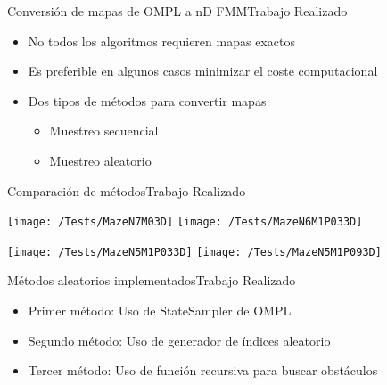 \documentclass[10pt]{beamer}
\begin{document}
\begin{frame}{Conversión de mapas de OMPL a nD FMM}{Trabajo Realizado}
	\begin{itemize}
		\item No todos los algoritmos requieren mapas exactos
		\item Es preferible en algunos casos minimizar el coste computacional
		
		\vspace{0.5cm}
		\item Dos tipos de métodos para convertir mapas
			\begin{itemize}
				\item Muestreo secuencial
				\item Muestreo aleatorio
			\end{itemize}
		
	\end{itemize}
\end{frame}


\begin{frame}{Comparación de métodos}{Trabajo Realizado}
\begin{center}
\texttt{[image: /Tests/MazeN7M03D]}
\texttt{[image: /Tests/MazeN6M1P033D]}

\texttt{[image: /Tests/MazeN5M1P033D]}
\texttt{[image: /Tests/MazeN5M1P093D]}
\end{center}
\end{frame}

\begin{frame}{Métodos aleatorios implementados}{Trabajo Realizado}
\vspace{1cm}
	\begin{itemize}
		\item Primer método: Uso de StateSampler de OMPL
		\item Segundo método: Uso de generador de índices aleatorio
		\item Tercer método: Uso de función recursiva para buscar obstáculos
	\end{itemize}
\end{frame}
\end{document}
